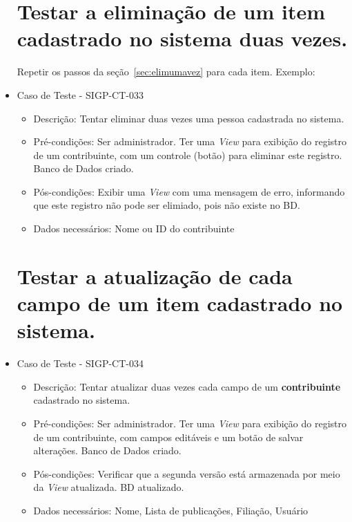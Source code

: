 \documentclass[11pt, a4paper]{book}
\begin{document}
\begin{itemize}
\newpage
\section{Testar a eliminação de um item cadastrado no sistema duas vezes.}

Repetir os passos da seção~\ref{sec:elimumavez} para cada item. Exemplo:

	\item Caso de Teste - SIGP-CT-033
	\begin{itemize}
	\item Descrição: Tentar eliminar duas vezes uma pessoa cadastrada no sistema.
	\item Pré-condições: Ser administrador. Ter uma \emph{View} para exibição do registro de um contribuinte, com um controle (botão) para eliminar este registro. Banco de Dados criado.
	\item Pós-condições: Exibir uma \emph{View} com uma mensagem de erro, informando que este registro não pode ser elimiado, pois não existe no BD.
	\item Dados necessários: Nome ou ID do contribuinte
	\end{itemize}

\newpage
\section{Testar a atualização de cada campo de um item cadastrado no sistema.}

	\item Caso de Teste - SIGP-CT-034
	\begin{itemize}
	\item Descrição: Tentar atualizar duas vezes cada campo de um \textbf{contribuinte} cadastrado no sistema.
	\item Pré-condições: Ser administrador. Ter uma \emph{View} para exibição do registro de um contribuinte, com campos editáveis e um botão de salvar alterações. Banco de Dados criado.
	\item Pós-condições: Verificar que a segunda versão está armazenada por meio da \emph{View} atualizada. BD atualizado.
	\item Dados necessários: Nome, Lista de publicações, Filiação, Usuário
	\end{itemize}

\newpage

\end{itemize}
\end{document}
